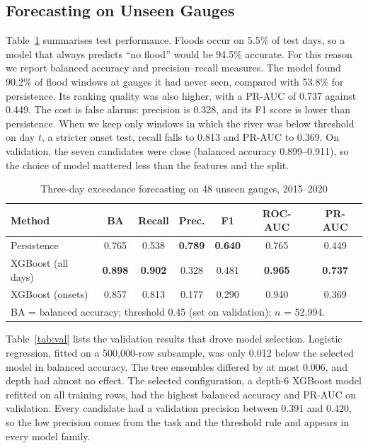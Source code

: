\documentclass[conference]{IEEEtran}
\begin{document}
\subsection{Forecasting on Unseen Gauges}
Table~\ref{tab:fc} summarises test performance. Floods occur on 5.5\% of test days, so a model that always predicts ``no flood'' would be 94.5\% accurate. For this reason we report balanced accuracy and precision--recall measures. The model found 90.2\% of flood windows at gauges it had never seen, compared with 53.8\% for persistence. Its ranking quality was also higher, with a PR-AUC of 0.737 against 0.449. The cost is false alarms: precision is 0.328, and its F1 score is lower than persistence. When we keep only windows in which the river was below threshold on day $t$, a stricter onset test, recall falls to 0.813 and PR-AUC to 0.369. On validation, the seven candidates were close (balanced accuracy 0.899--0.911), so the choice of model mattered less than the features and the split.

\begin{table}[t]
\caption{Three-day exceedance forecasting on 48 unseen gauges, 2015--2020}
\label{tab:fc}
\centering
\footnotesize
\setlength{\tabcolsep}{2.3pt}
\begin{tabular}{lcccccc}
\toprule
Method & BA & Recall & Prec. & F1 & ROC-AUC & PR-AUC\\
\midrule
Persistence & 0.765 & 0.538 & \textbf{0.789} & \textbf{0.640} & 0.765 & 0.449\\
XGBoost (all days) & \textbf{0.898} & \textbf{0.902} & 0.328 & 0.481 & \textbf{0.965} & \textbf{0.737}\\
XGBoost (onsets) & 0.857 & 0.813 & 0.177 & 0.290 & 0.940 & 0.369\\
\bottomrule
\multicolumn{7}{l}{\scriptsize BA = balanced accuracy; threshold 0.45 (set on validation); $n$ = 52,994.}
\end{tabular}
\end{table}

Table~\ref{tab:val} lists the validation results that drove model selection. Logistic regression, fitted on a 500,000-row subsample, was only 0.012 below the selected model in balanced accuracy. The tree ensembles differed by at most 0.006, and depth had almost no effect. The selected configuration, a depth-6 XGBoost model refitted on all training rows, had the highest balanced accuracy and PR-AUC on validation. Every candidate had a validation precision between 0.391 and 0.420, so the low precision comes from the task and the threshold rule and appears in every model family.
\end{document}
